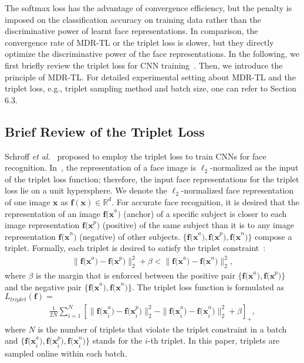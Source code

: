 \documentclass[10pt,journal,cspaper,compsoc]{IEEEtran}
\begin{document}
The softmax loss has the advantage of convergence efficiency, but the penalty is imposed on the classification accuracy on training data rather than the discriminative power of learnt face representations.
In comparison, the convergence rate of MDR-TL or the triplet loss is slower, but they directly optimize the discriminative power of the face representations.
In the following, we first briefly review the triplet loss for CNN training~\cite{hoffer2015deep,schroff2015facenet}. Then, we introduce the principle of MDR-TL.
For detailed experimental setting about MDR-TL and the triplet loss, e.g., triplet sampling method and batch size, one can refer to Section 6.3.


\subsection{Brief Review of the Triplet Loss}
Schroff \textit{et al.}~\cite{schroff2015facenet} proposed to employ the triplet loss to train CNNs for face recognition.
In~\cite{schroff2015facenet}, the representation of a face image is $\ell_2$-normalized as the input of the triplet loss function;
therefore, the input face representations for the triplet loss lie on a unit hypersphere.
We denote the $\ell_2$-normalized face representation of one image $\mathbf{x}$ as $\mathbf{f(x)} \in \mathbb{R}^{d}$.
For accurate face recognition, it is desired that the representation of an image $\mathbf{f(x}^a)$ (anchor) of a specific subject is closer to each image representation $\mathbf{f(x}^p)$ (positive)
of the same subject than it is to any image representation $\mathbf{f(x}^n)$ (negative) of other subjects.
$\{\mathbf{f(x}^a),\mathbf{f(x}^p),\mathbf{f(x}^n)\}$ compose a triplet.
Formally, each triplet is desired to satisfy the triplet constraint~\cite{schroff2015facenet}:
\begin{align}\label{E:tlConstraint}
\|\mathbf{f(x}^a)-\mathbf{f(x}^p)\|_2^2 + \beta < \|\mathbf{f(x}^a)-\mathbf{f(x}^n)\|_2^2,
\end{align}
where $\beta$ is the margin that is enforced between the positive pair $\{\mathbf{f(x}^a),\mathbf{f(x}^p)\}$ and the negative pair $\{\mathbf{f(x}^a),\mathbf{f(x}^n)\}$.
The triplet loss function is formulated as $L_{triplet}(\mathbf{f})=$
\begin{align}\label{E:triplet}
\frac{1}{2N} \sum_{i=1}^N \left[\|\mathbf{f(x}_{i}^a)-\mathbf{f(x}_{i}^p)\|_2^2-\|\mathbf{f(x}_{i}^a)-\mathbf{f(x}_{i}^n)\|_2^2+\beta \right]_{+},
\end{align}
where $N$ is the number of triplets that violate the triplet constraint in a batch
and $\{\mathbf{f(x}_{i}^a),\mathbf{f(x}_{i}^p),\mathbf{f(x}_{i}^n)\}$ stands for the $i$-th triplet.
In this paper, triplets are sampled online within each batch.
\end{document}
